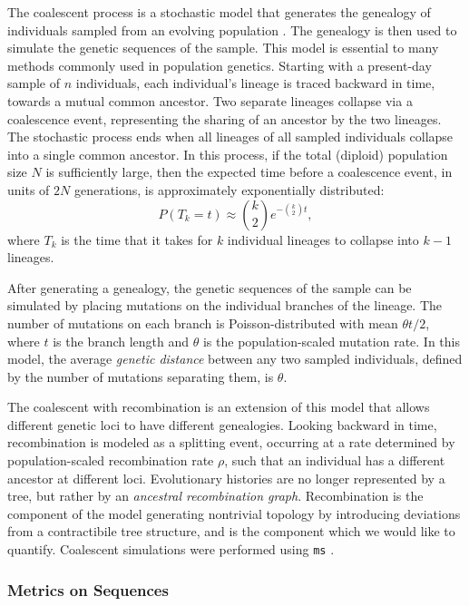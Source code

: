 The coalescent process is a stochastic model that generates the genealogy of individuals sampled from an evolving population \cite{Wakeley:2009}.
The genealogy is then used to simulate the genetic sequences of the sample.
This model is essential to many methods commonly used in population genetics.
Starting with a present-day sample of $n$ individuals, each individual's lineage is traced backward in time, towards a mutual common ancestor.
Two separate lineages collapse via a coalescence event, representing the sharing of an ancestor by the two lineages.
The stochastic process ends when all lineages of all sampled individuals collapse into a single common ancestor.
In this process, if the total (diploid) population size $N$ is sufficiently large, then the expected time before a coalescence event, in units of $2N$ generations, is approximately exponentially distributed:
\begin{equation}
P(T_{k}=t) \approx \binom{k}{2} e^{-\binom{k}{2} t},
\end{equation}
where $T_k$ is the time that it takes for $k$ individual lineages to collapse into $k-1$ lineages.

After generating a genealogy, the genetic sequences of the sample can be simulated by placing mutations on the individual branches of the lineage.
The number of mutations on each branch is Poisson-distributed with mean $\theta t / 2$, where $t$ is the branch length and $\theta$ is the population-scaled mutation rate.
In this model, the average \emph{genetic distance} between any two sampled individuals, defined by the number of mutations separating them, is $\theta$.

The coalescent with recombination is an extension of this model that allows different genetic loci to have different genealogies.
Looking backward in time, recombination is modeled as a splitting event, occurring at a rate determined by population-scaled recombination rate $\rho$, such that an individual has a different ancestor at different loci.
Evolutionary histories are no longer represented by a tree, but rather by an \emph{ancestral recombination graph}.
Recombination is the component of the model generating nontrivial topology by introducing deviations from a contractibile tree structure, and is the component which we would like to quantify.
Coalescent simulations were performed using \texttt{ms} \cite{Hudson:2002}.

\subsubsection{Metrics on Sequences}
\label{bg:subsubsec:metrics}

